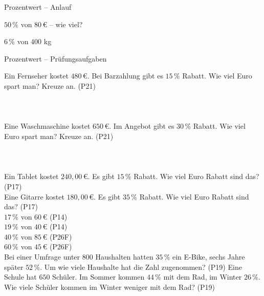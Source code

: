 \setcounter{aufgabe}{0}

\begin{aufgabe}{Prozentwert – Anlauf}
\begin{teile}
\teil $50\,\%$ von $80\,€$ – wie viel?

\leerfeld[€]
\teil $6\,\%$ von $400$ kg \leerfeld[kg]
\end{teile}
\end{aufgabe}

\begin{aufgabe}{Prozentwert – Prüfungsaufgaben}
\begin{teile}
\teil Ein Fernseher kostet $480\,€$. Bei Barzahlung gibt es $15\,\%$ Rabatt. Wie viel Euro spart man? Kreuze an. \hfill (P21)\\ \\ \\ \\ 
\teil Eine Waschmaschine kostet $650\,€$. Im Angebot gibt es $30\,\%$ Rabatt. Wie viel Euro spart man? Kreuze an. \hfill (P21)\\ \\ \\ \\ 
\teil Ein Tablet kostet $240{,}00\,€$. Es gibt $15\,\%$ Rabatt. Wie viel Euro Rabatt sind das? \hfill (P17) \\ \leerfeld[€]
\teil Eine Gitarre kostet $180{,}00\,€$. Es gibt $35\,\%$ Rabatt. Wie viel Euro Rabatt sind das? \hfill (P17) \\ \leerfeld[€]
\teil $17\,\%$ von $60\,€$ \hfill (P14) \\ \leerfeld[€]
\teil $19\,\%$ von $40\,€$ \hfill (P14) \\ \leerfeld[€]
\teil $40\,\%$ von $85\,€$ \hfill (P26F) \\ \leerfeld[€]
\teil $60\,\%$ von $45\,€$ \hfill (P26F) \\ \leerfeld[€]
\teil Bei einer Umfrage unter $800$ Haushalten hatten $35\,\%$ ein E-Bike, sechs Jahre später $52\,\%$. Um wie viele Haushalte hat die Zahl zugenommen? \hfill (P19)
\teil Eine Schule hat $650$ Schüler. Im Sommer kommen $44\,\%$ mit dem Rad, im Winter $26\,\%$. Wie viele Schüler kommen im Winter weniger mit dem Rad? \hfill (P19)
\end{teile}
\end{aufgabe}

\medskip
{}
